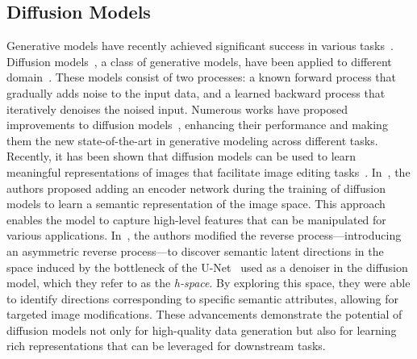 \subsection{Diffusion Models} Generative models have recently achieved significant success in various tasks~\cite{gan,score_based_generative_models,diffusion_beat_gans,vae}. Diffusion models~\cite{ddpm,ddim,diffusion_beat_gans,improved_denoising_diffusion_models}, a class of generative models, have been applied to different domain~\cite{diffusion_beat_gans,Diffusion_Bioinformatics,ldm}. These models consist of two processes: a known forward process that gradually adds noise to the input data, and a learned backward process that iteratively denoises the noised input. Numerous works have proposed improvements to diffusion models~\cite{diffusion_beat_gans,ldm,improved_denoising_diffusion_models}, enhancing their performance and making them the new state-of-the-art in generative modeling across different tasks. Recently, it has been shown that diffusion models can be used to learn meaningful representations of images that facilitate image editing tasks~\cite{diffusion_ae,diffusion_semantic_space}. In~\cite{diffusion_ae}, the authors proposed adding an encoder network during the training of diffusion models to learn a semantic representation of the image space. This approach enables the model to capture high-level features that can be manipulated for various applications. In~\cite{diffusion_semantic_space}, the authors modified the reverse process—introducing an asymmetric reverse process—to discover semantic latent directions in the space induced by the bottleneck of the U-Net~\cite{Unet} used as a denoiser in the diffusion model, which they refer to as the \textit{h-space}. By exploring this space, they were able to identify directions corresponding to specific semantic attributes, allowing for targeted image modifications. These advancements demonstrate the potential of diffusion models not only for high-quality data generation but also for learning rich representations that can be leveraged for downstream tasks.
